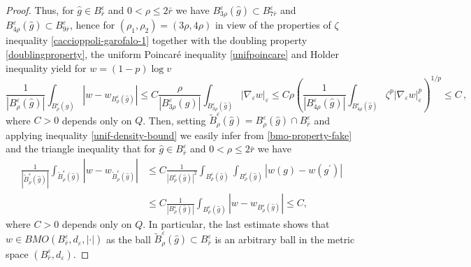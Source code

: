 \documentclass[10pt]{amsart}
\numberwithin{equation}{section}
\theoremstyle{definition}
\begin{document}
\begin{proof}
Thus, for $\hat{g} \in B^\varepsilon_{\bar{r}}$ and $0<\rho \leq  2\bar{r}$ we have $B^\varepsilon_{3\rho}(\hat{g})\subset B^\varepsilon_{7\bar{r}}$ and $B^\varepsilon_{4\rho}(\hat{g})\subset B^\varepsilon_{9\bar{r}}$, hence for $(\rho_1,\rho_2)=(3\rho,4\rho)$ in view of the properties of $\zeta$ inequality \eqref{caccioppoli-garofalo-1} together with the doubling property \eqref{doublingproperty}, the uniform Poincar\'{e} inequality \eqref{unifpoincare} and Holder inequality yield for $w=(1-p)\log v$
\begin{equation}
\label{bmo-property-fake}
\frac{1}{|B^\varepsilon_\rho(\hat{g})|}\int_{B^\varepsilon_\rho(\hat{g})} |w-  w_{B^\varepsilon_\rho(\hat{g})}| \leq C  \frac{\rho}{|B^\varepsilon_{3\rho}(\hat{g})|} \int_{B^\varepsilon_{3\rho}(\hat{g})} | \nabla_\varepsilon w |_\varepsilon \leq C \rho \left( \frac{1}{|B^\varepsilon_{4\rho}(\hat{g})|} \int_{B^\varepsilon_{4\rho}(\hat{g})} \zeta^p | \nabla_\varepsilon w |^p_\varepsilon\right)^{1/p} \leq C\, ,  
\end{equation}
where $C>0$ depends only on $Q$. Then, setting $\widetilde{B}^\varepsilon_\rho(\hat{g})= B^\varepsilon_\rho(\hat{g})\cap B^\varepsilon_{\bar{r}} $ and applying inequality \eqref{unif-density-bound} we easily infer from \eqref{bmo-property-fake} and the triangle inequality that for $\hat{g} \in B^\varepsilon_{\bar{r}}$ and $0<\rho \leq  2\bar{r}$ we have
\begin{equation}
\label{bmo-property}
\begin{aligned}
\frac{1}{|\widetilde{B}^\varepsilon_\rho(\hat{g}) |}\int_{\widetilde{B}^\varepsilon_\rho(\hat{g}) } |w-  w_{\widetilde{B}^\varepsilon_\rho(\hat{g})}| 	&\leq C \frac{1}{|B^\varepsilon_\rho(\hat{g})|^2} \int_{B^\varepsilon_\rho(\hat{g})} \int_{B^\varepsilon_\rho(\hat{g})} |w(g)-  w (g^\prime)|\\
&\leq  C\frac{1}{|B^\varepsilon_\rho(\hat{g})|}\int_{B^\varepsilon_\rho(\hat{g})} |w-  w_{B^\varepsilon_\rho(\hat{g})}|  \leq C,
\end{aligned}
\end{equation}
where $C>0$ depends only on $Q$. In particular, the last estimate shows that $w \in BMO(B^\varepsilon_{\bar{r}}, d_\varepsilon, |\cdot|)$ as the ball $\widetilde{B}^\varepsilon_{\rho}(\hat{g}) \subset B^\varepsilon_{\bar{r}}$ is an arbitrary ball in the metric space $(B^\varepsilon_{\bar{r}}, d_\varepsilon)$. 


\end{proof}
\end{document}
